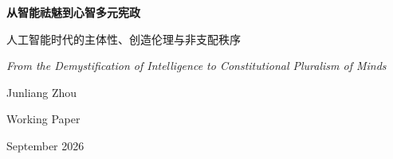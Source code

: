 \documentclass[11pt,letterpaper]{article}
\begin{document}
\begin{titlepage}
\centering
\vspace*{1.3in}
{\Huge\bfseries 从智能祛魅到心智多元宪政\par}
\vspace{0.35in}
{\Large 人工智能时代的主体性、创造伦理与非支配秩序\par}
\vspace{0.3in}
{\large \textit{From the Demystification of Intelligence to Constitutional Pluralism of Minds}\par}
\vfill
{\Large Junliang Zhou\par}
\vspace{0.2in}
{\normalsize Working Paper\par}
\vspace{0.12in}
{\normalsize September 2026\par}
\vfill
\end{titlepage}
\end{document}
